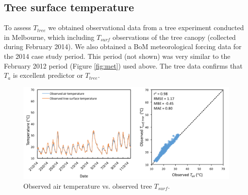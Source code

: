 \documentclass[gmd, manuscript]{copernicus}
\begin{document}
\subsection{Tree surface temperature}\label{app:tree_surf}  

To assess $T_{tree}$ we obtained observational data from a tree experiment conducted in Melbourne, which including $T_{surf}$ observations of the tree canopy (collected during February 2014). We also obtained a BoM meteorological forcing data for the 2014 case study period.  This period (not shown) was very similar to the February 2012 period (Figure \ref{fig:met}) used above. The tree data confirms that \ensuremath{T_{a}} is excellent predictor or $T_{tree}$. 

\begin{figure}
\begin{center}
\end{center}
\includegraphics[width=1\textwidth,keepaspectratio]{figure13.png}
 \caption{Observed air temperature vs. observed tree $T_{surf}$.} \label{fig:TreeTsurfvsTair}
\end{figure}
\end{document}
